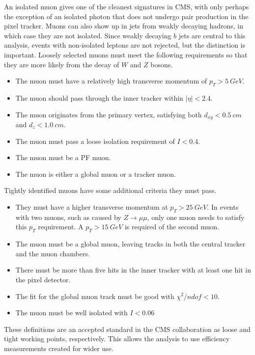 An isolated muon gives one of the cleanest signatures in CMS,
with only perhaps the exception of an isolated photon that does not
undergo pair production in the pixel tracker.
Muons can also show up in jets from weakly decaying hadrons,
in which case they are not isolated.
Since weakly decaying $b$ jets are central to this analysis,
events with non-isolated leptons are not rejected,
but the distinction is important.
Loosely selected muons must meet the following requirements so that they
are more likely from the decay of $W$ and $Z$ bosons.
\begin{itemize}
\item The muon must have a relatively high transverse momentum of $p_T > \SI{5}{GeV}$.
\item The muon should pass through the inner tracker within $|\eta| < 2.4$.
\item The muon originates from the primary vertex, satisfying both
  $d_{xy} < \SI{0.5}{cm}$ and $d_z < \SI{1.0}{cm}$.
\item The muon must pass a loose isolation requirement of $I < 0.4$.
\item The muon must be a PF muon.
\item The muon is either a global muon or a tracker muon.
\end{itemize}
Tightly identified muons have some additional criteria they must pass.
\begin{itemize}
\item They must have a higher transverse momentum at $p_T > \SI{25}{GeV}$.
  In events with two muons, such as caused by $Z \rightarrow \mu\mu$,
  only one muon needs to satisfy this $p_T$ requirement.
  A $p_T > \SI{15}{GeV}$ is required of the second muon.
\item The muon must be a global muon, leaving tracks in both the central tracker
  and the muon chambers.
\item There must be more than five hits in the inner tracker with at least one hit in the pixel detector.
\item The fit for the global muon track must be good with $\chi^2/ndof < 10$.
\item The muon must be well isolated with $I < 0.06$
\end{itemize}

These definitions are an accepted standard in the CMS collaboration
as loose and tight working points, respectively.
This allows the analysis to use efficiency measurements created for wider use.

